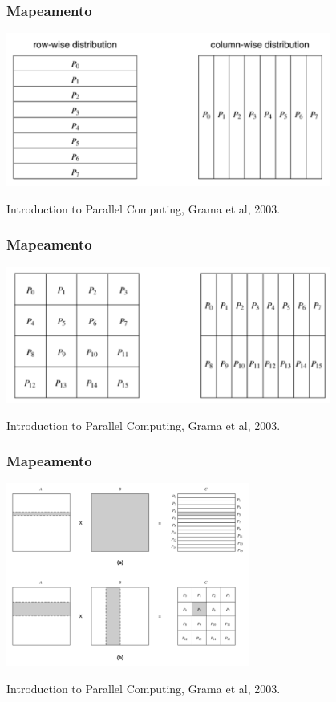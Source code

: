 \documentclass[xcolor={usenames,dvipsnames},12pt,presentation,aspectratio=169]{beamer}
\begin{document}
\begin{frame}
  \frametitle{Mapeamento}
  \vspace{-4mm}
  \begin{center}
	\includegraphics[width=0.8\textwidth]{map1.png}
  \end{center}
  \vfill
  {\tiny Introduction to Parallel Computing, Grama et al, 2003.}
\end{frame}
\begin{frame}
  \frametitle{Mapeamento}
  \vspace{-4mm}
  \begin{center}
	\includegraphics[width=0.8\textwidth]{map2.png}
  \end{center}
  \vfill
  {\tiny Introduction to Parallel Computing, Grama et al, 2003.}
\end{frame}
\begin{frame}
  \frametitle{Mapeamento}
  \vspace{-4mm}
  \begin{center}
	\includegraphics[width=0.6\textwidth]{map3.png}
  \end{center}
  \vfill
  {\tiny Introduction to Parallel Computing, Grama et al, 2003.}
\end{frame}
\end{document}
